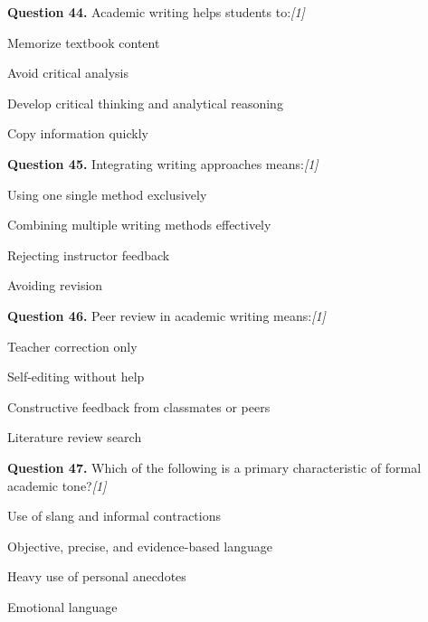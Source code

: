\documentclass[11pt,a4paper]{article}
\newcommand{\pts}[1]{\hfill   \textit{[#1]}}
\begin{document}
\medskip




\noindent   \textbf{Question 44.} Academic writing helps students to:\pts{1}

\begin{parts}
  \item Memorize textbook content
  \item Avoid critical analysis
  \item Develop critical thinking and analytical reasoning
  \item Copy information quickly
\end{parts}

\medskip




\noindent   \textbf{Question 45.} Integrating writing approaches means:\pts{1}

\begin{parts}
  \item Using one single method exclusively
  \item Combining multiple writing methods effectively
  \item Rejecting instructor feedback
  \item Avoiding revision
\end{parts}

\medskip




\noindent   \textbf{Question 46.} Peer review in academic writing means:\pts{1}

\begin{parts}
  \item Teacher correction only
  \item Self-editing without help
  \item Constructive feedback from classmates or peers
  \item Literature review search
\end{parts}

\medskip




\noindent   \textbf{Question 47.} Which of the following is a primary characteristic of formal academic tone?\pts{1}

\begin{parts}
  \item Use of slang and informal contractions
  \item Objective, precise, and evidence-based language
  \item Heavy use of personal anecdotes
  \item Emotional language
\end{parts}
\end{document}
